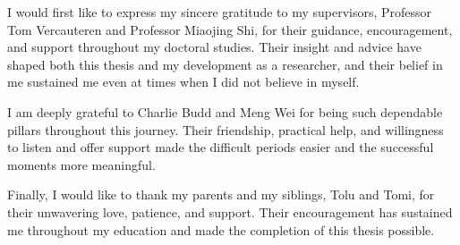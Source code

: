I would first like to express my sincere gratitude to my supervisors, Professor Tom Vercauteren and Professor Miaojing Shi, for their guidance, encouragement, and support throughout my doctoral studies. Their insight and advice have shaped both this thesis and my development as a researcher, and their belief in me sustained me even at times when I did not believe in myself.

I am deeply grateful to Charlie Budd and Meng Wei for being such dependable pillars throughout this journey. Their friendship, practical help, and willingness to listen and offer support made the difficult periods easier and the successful moments more meaningful.

Finally, I would like to thank my parents and my siblings, Tolu and Tomi, for their unwavering love, patience, and support. Their encouragement has sustained me throughout my education and made the completion of this thesis possible.
